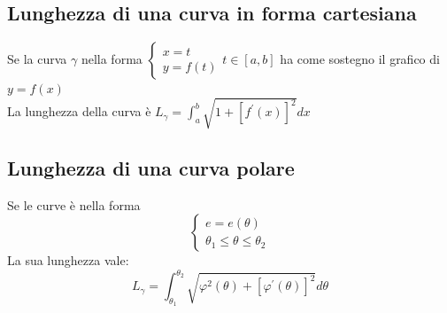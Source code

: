 \subsection{Lunghezza di una curva in forma cartesiana}
Se la curva $\gamma$ nella forma $\begin{cases}
	x=t\\
	y=f(t)
\end{cases} t\in [a,b]$ ha come sostegno il grafico di $y=f(x)$\\
La lunghezza della curva è $L_\gamma=\int_{a}^{b}\sqrt{1+[f^\prime(x)]^2}dx$
\subsection{Lunghezza di una curva polare}
Se le curve è nella forma 
\begin{equation*}
	\begin{cases}
		e=e(\theta)\\
		\theta_1\leq\theta\leq\theta_2
	\end{cases} 
\end{equation*}
La sua lunghezza vale: 
\begin{equation*}
	L_\gamma
	=\int_{\theta_1}^{\theta_2}\sqrt{\varphi^2(\theta)+[\varphi^\prime(\theta)]^2}
	d\theta
\end{equation*}
